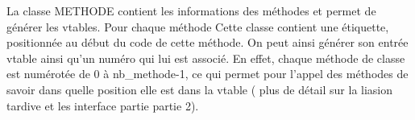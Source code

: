 La classe METHODE contient les informations des méthodes et permet de générer
les vtables. Pour chaque méthode Cette classe contient une étiquette,
positionnée au début du code de cette méthode. On peut ainsi générer son entrée
vtable ainsi qu'un numéro qui lui est associé. En effet, chaque méthode de
classe est numérotée de 0 à nb\_methode-1, ce qui permet pour l'appel des
méthodes de savoir dans quelle position elle est dans la vtable ( plus de détail
sur la liasion tardive et les interface partie partie 2).\\


